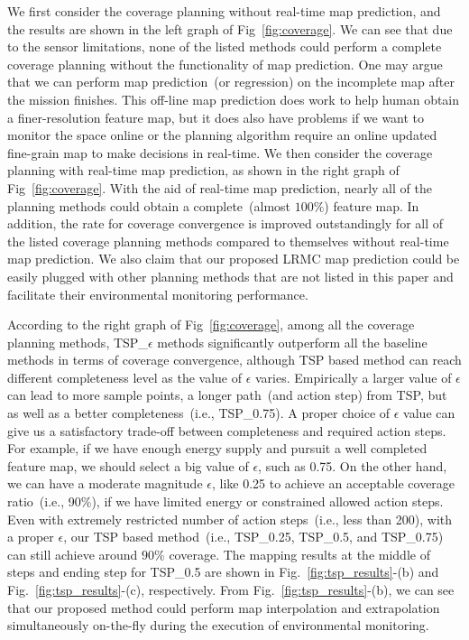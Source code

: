 We first consider the coverage planning without real-time map prediction, and the results are shown in the left graph of Fig~\ref{fig:coverage}. We can see that due to the sensor limitations, none of the listed methods could perform a complete coverage planning without the functionality of map prediction. One may argue that we can perform map prediction~(or regression) on the incomplete map after the mission finishes. This off-line map prediction does work to help human obtain a finer-resolution feature map, but it does also have problems if we want to monitor the space online or the planning algorithm require an online updated fine-grain map to make decisions in real-time. We then consider the coverage planning with real-time map prediction, as shown in the right graph of Fig~\ref{fig:coverage}. With the aid of real-time map prediction, nearly all of the planning methods could obtain a complete~(almost $100\%$) feature map. In addition, the rate for coverage convergence is improved outstandingly for all of the listed coverage planning methods compared to themselves without real-time map prediction. We also claim that our proposed LRMC map prediction could be easily plugged with other planning methods that are not listed in this paper and facilitate their environmental monitoring performance.

According to the right graph of Fig~\ref{fig:coverage}, among all the coverage planning methods, TSP\_$\epsilon$ methods significantly outperform all the baseline methods in terms of coverage convergence, although TSP based method can reach different completeness level as the value of $\epsilon$ varies. Empirically a larger value of $\epsilon$ can lead to more sample points, a longer path~(and action step) from TSP, but as well as a better completeness~(i.e., TSP\_{0.75}). A proper choice of $\epsilon$ value can give us a satisfactory trade-off between completeness and required action steps. For example, if we have enough energy supply and pursuit a well completed feature map, we should select a big value of $\epsilon$, such as 0.75. On the other hand, we can have a moderate magnitude $\epsilon$, like 0.25 to achieve an acceptable coverage ratio~(i.e., 90\%), if we have limited energy or constrained allowed action steps. Even with extremely restricted number of action steps~(i.e., less than 200), with a proper $\epsilon$, our TSP based method~(i.e., TSP\_{0.25}, TSP\_{0.5}, and TSP\_{0.75}) can still achieve around $90\%$ coverage. The mapping results at the middle of steps and ending step for TSP\_{0.5} are shown in Fig.~\ref{fig:tsp_results}-(b) and Fig.~\ref{fig:tsp_results}-(c), respectively. From Fig.~\ref{fig:tsp_results}-(b), we can see that our proposed method could perform map interpolation and extrapolation simultaneously on-the-fly during the execution of environmental monitoring.

